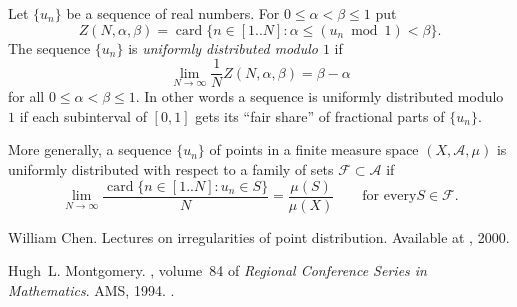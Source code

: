 \documentclass[12pt]{article}
\begin{document}
Let $\{u_n\}$ be a sequence of real numbers. For
$0\leq\alpha<\beta\leq 1$ put
\begin{equation*}
Z(N,\alpha,\beta)=\operatorname{card}\{n\in[1..N] : \alpha \leq
(u_n \bmod 1)< \beta \}.
\end{equation*}
The sequence $\{u_n\}$ is \emph{uniformly distributed modulo $1$}
if
\begin{equation*}\label{eq:modcond}
\lim_{N\to\infty} \frac{1}{N} Z(N,\alpha,\beta)=\beta-\alpha
\end{equation*}
for all $0\leq\alpha<\beta\leq 1$. In other words a sequence is
uniformly distributed modulo $1$ if each subinterval of $[0,1]$
gets its ``fair share'' of fractional parts of $\{u_n\}$.

More generally, a sequence $\{u_n\}$ of points in a finite measure
space $(X,\mathcal{A},\mu)$ is uniformly distributed with respect
to a family of sets $\mathcal{F}\subset\mathcal{A}$ if
\begin{equation*}
\lim_{N\to\infty} \frac{\operatorname{card}\{n\in[1..N] :u_n\in
S\}}{N}=\frac{\mu(S)}{\mu(X)}\qquad\text{for every
}S\in\mathcal{F}.
\end{equation*}

\begin{thebibliography}{1}

William Chen.
\newblock Lectures on irregularities of point distribution.
\newblock Available at , 2000.

Hugh~L. Montgomery.
, volume~84 of {\em Regional Conference Series in
  Mathematics}.
\newblock AMS, 1994.
\newblock {}.

\end{thebibliography}
\end{document}
